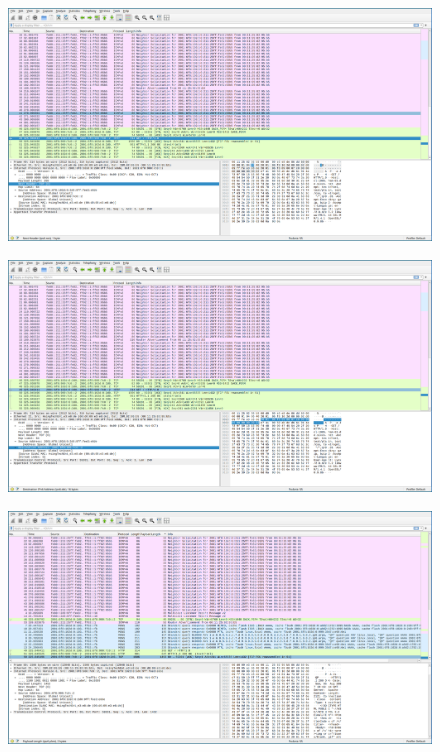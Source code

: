 \begin{figure}[p]
    \centering
    \includegraphics[width=1\textwidth]{./assets/4.17.a.2.png}
    \caption{}
    \label{fig:4.17.a.2}
\end{figure}

\FloatBarrier

\begin{figure}[p]
    \centering
    \includegraphics[width=1\textwidth]{./assets/4.17.c.1.png}
    \caption{}
    \label{fig:4.17.c.1}
\end{figure}

\begin{figure}[p]
    \centering
    \includegraphics[width=1\textwidth]{./assets/4.17.d.1.png}
    \caption{}
    \label{fig:4.17.d.1}
\end{figure}
